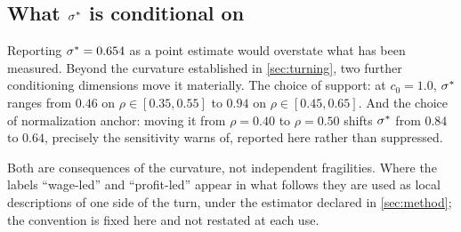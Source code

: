 \subsection{What \texorpdfstring{$\sigma^{\ast}$}{sigma*} is conditional on}
\label{sec:frontier-fragility}

Reporting $\sigma^{\ast} = 0.654$ as a point estimate would overstate what has been
measured. Beyond the curvature established in \cref{sec:turning}, two further
conditioning dimensions move it materially. The choice of support: at
$c_0 = 1.0$, $\sigma^{\ast}$ ranges from $0.46$ on $\rho \in [0.35, 0.55]$ to
$0.94$ on $\rho \in [0.45, 0.65]$. And the choice of normalization
anchor: moving it from $\rho = 0.40$ to $\rho = 0.50$ shifts $\sigma^{\ast}$ from
$0.84$ to $0.64$, precisely the sensitivity \citet{Temple2012} warns of,
reported here rather than suppressed.

Both are consequences of the curvature, not independent fragilities. Where the
labels ``wage-led'' and ``profit-led'' appear in what follows they are used as
local descriptions of one side of the turn, under the estimator declared in
\cref{sec:method}; the convention is fixed here and not restated at each use.
